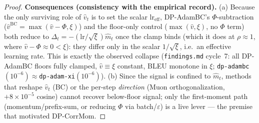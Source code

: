 \begin{proof}
\medskip
\par\smallskip\noindent\textbf{Consequences (consistency with the empirical record).}\quad 
(a) Because the only surviving role of $\hat v_t$ is to set the scalar $\mathrm{lr}_{\mathrm{eff}}$,
DP-AdamBC's $\Phi$-subtraction ($\hat v^{\mathrm{BC}}=\max(\hat v-\Phi,\xi)$) and the floor-only
control ($\max(\hat v,\xi)$, no $\Phi$ term) both reduce to $\Delta_t=-(\mathrm{lr}/\sqrt\xi)\hat m_t$
once the clamp binds (which it does at $\rho\approx1$, where $\hat v-\Phi\approx0<\xi$): they differ
only in the scalar $1/\sqrt\xi$, i.e.\ an effective learning rate. This is exactly the observed
collapse (\texttt{findings.md} cycle~7: all DP-AdamBC floors fully clamped, $\hat v\equiv\xi$ constant,
BLEU monotone in $\xi$; \texttt{dp-adambc}$(10^{-6})\!\approx\!$\texttt{dp-adam-xi}$(10^{-6})$). (b)
Since the signal is confined to $\hat m_t$, methods that reshape $\hat v_t$ (BC) or the per-step
\emph{direction} (Muon orthogonalization, $+8\times10^{-5}$ cosine) cannot recover below-floor signal;
only the first-moment path (momentum/prefix-sum, or reducing $\Phi$ via batch/$\varepsilon$) is a live
lever --- the premise that motivated DP-CorrMom.


\end{proof}
